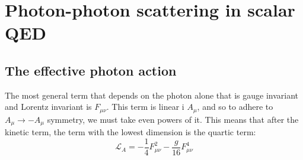 \documentclass{article}
\begin{document}
\newpage
\section{Photon-photon scattering in scalar QED}
\subsection{The effective photon action}
The most general term that depends on the photon alone that is gauge invariant and Lorentz invariant is $F_{\mu\nu}$. This term is linear i $A_\mu$, and so to adhere to $A_\mu \rightarrow -A_\mu$ symmetry, we must take even powers of it. This means that after the kinetic term, the term with the lowest dimension is the quartic term:
\begin{equation}
    \mathcal{L}_A = -\frac{1}{4}F_{\mu\nu}^2 - \frac{g}{16}F_{\mu\nu}^4
\end{equation}
\end{document}
